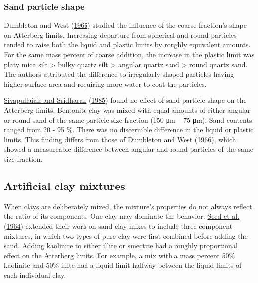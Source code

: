 \documentclass[
  letterpaper,
  openany]{book}
\begin{document}
\hypertarget{sand-particle-shape}{%
\subsubsection{Sand particle shape}\label{sand-particle-shape}}

Dumbleton and West (\protect\hyperlink{ref-Dumbleton1966b}{1966}) studied the influence of the coarse fraction's shape on Atterberg limits.
Increasing departure from spherical and round particles tended to raise both the liquid and plastic limits by roughly equivalent amounts.
For the same mass percent of coarse addition, the increase in the plastic limit was platy mica silt \textgreater{} bulky quartz silt \textgreater{} angular quartz sand \textgreater{} round quartz sand.
The authors attributed the difference to irregularly-shaped particles having higher surface area and requiring more water to coat the particles.

\protect\hyperlink{ref-Sivapullaiah1985}{Sivapullaiah and Sridharan} (\protect\hyperlink{ref-Sivapullaiah1985}{1985}) found no effect of sand particle shape on the Atterberg limits.
Bentonite clay was mixed with equal amounts of either angular or round sand of the same particle size fraction (150 μm -- 75 μm). Sand contents ranged from 20 - 95 \%.
There was no discernible difference in the liquid or plastic limits.
This finding differs from those of \protect\hyperlink{ref-Dumbleton1966b}{Dumbleton and West} (\protect\hyperlink{ref-Dumbleton1966b}{1966}), which showed a measureable difference between angular and round particles of the same size fraction.

\hypertarget{multiple-clay-type-mixtures}{%
\subsection{Artificial clay mixtures}\label{multiple-clay-type-mixtures}}

When clays are deliberately mixed, the mixture's properties do not always reflect the ratio of its components. One clay may dominate the behavior.
\protect\hyperlink{ref-Seed1964a}{Seed et al.} (\protect\hyperlink{ref-Seed1964a}{1964}) extended their work on sand-clay mixes to include three-component mixtures, in which two types of pure clay were first combined before adding the sand.
Adding kaolinite to either illite or smectite had a roughly proportional effect on the Atterberg limits.
For example, a mix with a mass percent 50\% kaolinite and 50\% illite had a liquid limit halfway between the liquid limits of each individual clay.
\end{document}
